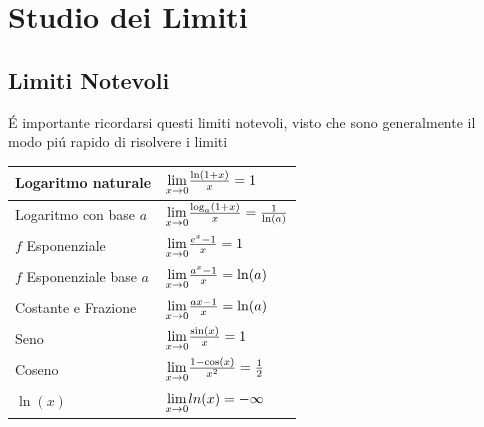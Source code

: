 \documentclass[12pt, a4paper, openany]{book}
\begin{document}
\chapter{Studio dei Limiti}

\section{Limiti Notevoli}
É importante ricordarsi questi limiti notevoli, visto che sono generalmente il modo piú rapido di risolvere i limiti

\begin{tabularx}{\textwidth}{ |X|X| }
	\hline
	Logaritmo naturale        & $\underset{x \to 0}{\lim} \frac{\ln(1+x)}{x} = 1 $                   \\
	\hline
	Logaritmo con base $a$    & $\underset{x \to 0}{\lim} \frac{\log_a(1+x)}{x} = \frac{1}{\ln(a)} $ \\
	\hline
	$f$ Esponenziale          & $\underset{x \to 0}{\lim} \frac{e^x-1}{x} = 1$                       \\
	\hline
	$f$ Esponenziale base $a$ & $\underset{x \to 0}{\lim} \frac{a^x-1}{x} = \ln(a)$                  \\
	\hline
	Costante e Frazione       & $\underset{x \to 0}{\lim}\frac{ax -1}{x} = \ln(a)$                   \\
	\hline
	Seno                      & $\underset{x \to 0}{\lim}\frac{\sin(x)}{x} = 1$                      \\
	\hline
	Coseno                    & $\underset{x \to 0}{\lim} \frac{1-\cos(x)}{x^2} = \frac{1}{2} $      \\
	\hline
	\hline
	$\ln(x)$                  & $\underset{x \to 0}{\lim} ln(x) = -\infty $                          \\ %
	\hline
\end{tabularx}

\pagebreak
\end{document}
